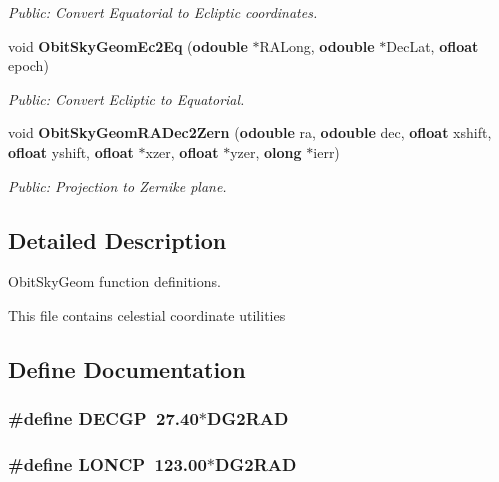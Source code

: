 \begin{CompactItemize}
\begin{CompactList}\small\item\em Public: Convert Equatorial to Ecliptic coordinates. \item\end{CompactList}\item 
void {\bf Obit\-Sky\-Geom\-Ec2Eq} ({\bf odouble} $\ast$RALong, {\bf odouble} $\ast$Dec\-Lat, {\bf ofloat} epoch)
\begin{CompactList}\small\item\em Public: Convert Ecliptic to Equatorial. \item\end{CompactList}\item 
void {\bf Obit\-Sky\-Geom\-RADec2Zern} ({\bf odouble} ra, {\bf odouble} dec, {\bf ofloat} xshift, {\bf ofloat} yshift, {\bf ofloat} $\ast$xzer, {\bf ofloat} $\ast$yzer, {\bf olong} $\ast$ierr)
\begin{CompactList}\small\item\em Public: Projection to Zernike plane. \item\end{CompactList}\end{CompactItemize}


\subsection{Detailed Description}
Obit\-Sky\-Geom function definitions. 

This file contains celestial coordinate utilities

\subsection{Define Documentation}
\subsubsection{\setlength{\rightskip}{0pt plus 5cm}\#define DECGP\ 27.40$\ast$DG2RAD}\label{ObitSkyGeom_8c_a1}


\subsubsection{\setlength{\rightskip}{0pt plus 5cm}\#define LONCP\ 123.00$\ast$DG2RAD}\label{ObitSkyGeom_8c_a2}


